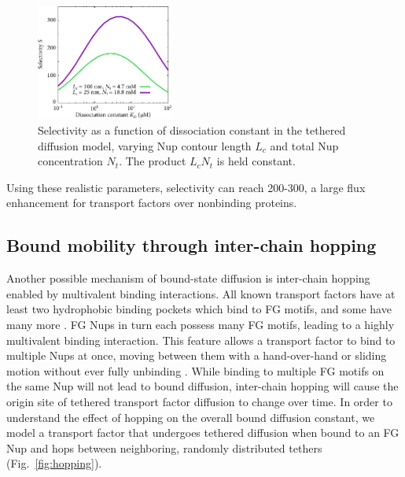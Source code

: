 \begin{figure}
\centering
\includegraphics[width=0.4\textwidth]{figs/ch02/chain-comparison.pdf}
\caption[Nup contour length and concentration comparison.]{Selectivity as a function of dissociation
  constant in the tethered diffusion model, varying Nup contour length $L_c$ and total Nup concentration $N_t$.  The product $L_cN_t$ is held constant.}
\label{fig:chainComparison}
\end{figure}

 Using these realistic parameters, selectivity can reach 200-300, a large flux enhancement for transport factors over nonbinding proteins.

\subsection{Bound mobility through inter-chain hopping}
\label{sec:hopping}

Another possible mechanism of bound-state diffusion is inter-chain hopping enabled by multivalent binding interactions.  All known transport factors have at least two hydrophobic binding pockets which bind to FG motifs, and some have many more \cite{wagner15}.  FG Nups in turn each possess many FG motifs, leading to a highly multivalent binding interaction.  This feature allows a transport factor to bind to multiple Nups at once, moving between them with a hand-over-hand or sliding motion without ever fully unbinding \cite{raveh16, tetenbaum-novatt12}.  While binding to multiple FG motifs on the same Nup will not lead to bound diffusion, inter-chain hopping will cause the origin site of tethered transport factor diffusion to change over time.  In order to understand the effect of hopping on the overall bound diffusion constant, we model a transport factor that undergoes tethered diffusion when bound to an FG Nup and hops between neighboring, randomly distributed tethers (Fig.~\ref{fig:hopping}).



